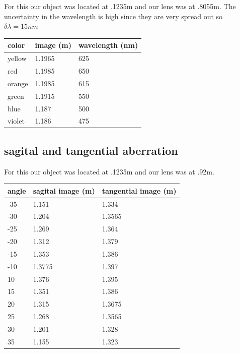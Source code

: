 \documentclass[12pt,a4paper]{article}
\begin{document}
For this our object was located at .1235m and our lens was at .8055m.  The uncertainty in the wavelength is high since they are very spread out so $\delta \lambda=15nm$\\
\begin{tabular}{|l|l|l|}
\hline
color & image (m) & wavelength (nm)\\
\hline
yellow & 1.1965 & 625\\
\hline
red & 1.1985 & 650\\
\hline
orange & 1.1985 & 615\\
\hline
green & 1.1915 & 550\\
\hline
blue & 1.187 & 500\\
\hline
violet & 1.186 & 475\\
\hline
\end{tabular}
\subsection{sagital and tangential aberration}
For this our object was located at .1235m and our lens was at .92m.\\
\begin{tabular}{|l|l|l|}
\hline
angle & sagital image (m) & tangential image (m)\\
\hline
-35 & 1.151 & 1.334\\
\hline
-30 & 1.204 & 1.3565\\
\hline
-25 & 1.269 & 1.364\\
\hline
-20 & 1.312 & 1.379\\
\hline
-15 & 1.353 & 1.386\\
\hline
-10 & 1.3775 & 1.397\\
\hline
10 & 1.376 & 1.395\\
\hline
15 & 1.351 & 1.386\\
\hline
20 & 1.315 & 1.3675\\
\hline
25 & 1.268 & 1.3565\\
\hline
30 & 1.201 & 1.328\\
\hline
35 & 1.155 & 1.323\\
\hline

\end{tabular}
\end{document}
